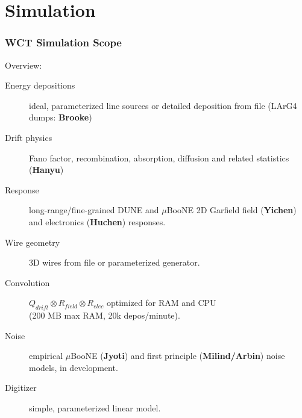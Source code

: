 \documentclass[xcolor=dvipsnames]{beamer}
\begin{document}



\section{Simulation}

\begin{frame}
  \frametitle{WCT Simulation Scope}
  Overview:
  \begin{description}
  \item[Energy depositions] ideal, parameterized line sources or
    detailed deposition from file (LArG4 dumps: \textbf{Brooke})
  \item[Drift physics] Fano factor, recombination, absorption,
    diffusion and related statistics (\textbf{Hanyu})
  \item[Response] long-range/fine-grained DUNE and $\mu$BooNE 2D
    Garfield field (\textbf{Yichen}) and electronics (\textbf{Huchen}) responses.
  \item[Wire geometry] 3D wires from file or parameterized generator.
  \item[Convolution] $Q_{drift} \otimes R_{field} \otimes R_{elec}$
    optimized for RAM and CPU \\
    {\footnotesize (200 MB max RAM, 20k depos/minute)}.
  \item[Noise] empirical $\mu$BooNE (\textbf{Jyoti}) and first principle 
    (\textbf{Milind/Arbin}) noise models, in development.
  \item[Digitizer] simple, parameterized linear model.
  \end{description}
\end{frame}
\end{document}
